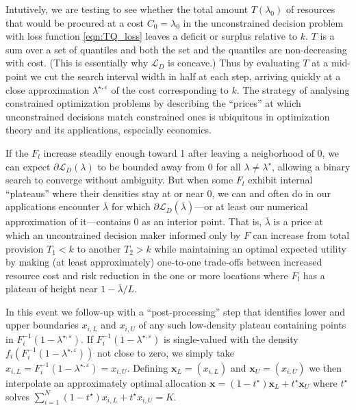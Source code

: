 \documentclass{article}
\begin{document}
Intutively, we are testing to see whether the total amount $T(\lambda_0)$ of resources that would be procured at a cost $C_0=\lambda_0$ in the unconstrained decision problem with loss function \eqref{eqn:TQ_loss} leaves a deficit or surplus relative to $k$. $T$ is a sum over a set of quantiles and both the set and the quantiles are non-decreasing with cost. (This is essentially why $\mathcal{L}_D$ is concave.) Thus by evaluating $T$ at a mid-point we cut the search interval width in half at each step, arriving quickly at a close approximation $\lambda^{\star, \varepsilon}$ of the cost corresponding to $k$. The strategy of analysing constrained optimization problems by describing the ``prices'' at which unconstrained decisions match constrained ones is ubiquitous in optimization theory and its applications, especially economics.

If the $F_l$ increase steadily enough toward 1 after leaving a neigborhood of 0, we can expect $\partial \mathcal{L}_D(\lambda)$ to be bounded away from 0 for all $\lambda \neq \lambda^{\star}$, allowing a binary search to converge without ambiguity.  But when some $F_l$ exhibit internal ``plateaus'' where their densities stay at or near 0, we can and often do in our applications encounter $\overline{\lambda}$ for which $\partial \mathcal{L}_D(\overline{\lambda})$---or at least our numerical approximation of it---contains 0 as an interior point. That is, $\overline{\lambda}$ is a price at which an uncontrained decision maker informed only by $F$ can increase from total provision $T_1<k$ to another $T_2>k$ while maintaining an optimal expected utility by making (at least approximately) one-to-one trade-offs between increased resource cost and risk reduction in the one or more locations where $F_l$ has a plateau of height near $1-\overline{\lambda}/L$. 

In this event we follow-up with a ``post-processing'' step that identifies lower and upper boundaries $x_{i,L}$ and $x_{i,U}$ of any
such low-density plateau containing points in $F_{i}^{-1}(1-\lambda^{\star, \varepsilon})$. If $F_{i}^{-1}(1-\lambda^{\star, \varepsilon})$ is single-valued 
with the density $f_i(F_{i}^{-1}(1-\lambda^{\star, \varepsilon}))$ not close to zero, we simply take $x_{i,L} = F_{i}^{-1}(1-\lambda^{\star, \varepsilon}) = x_{i,U}$. Defining $\mathbf{x}_L = (x_{i,L})$ and $\mathbf{x}_U = (x_{i,U})$ we then interpolate an approximately optimal allocation 
$\mathbf{x} = (1-t^{\star})\mathbf{x}_L + t^{\star}\mathbf{x}_U$ where $t^{\star}$ solves 
$\sum_{i=1}^{N }(1-t^{\star})x_{i,L} + t^{\star}x_{i,U} = K$.
\end{document}
